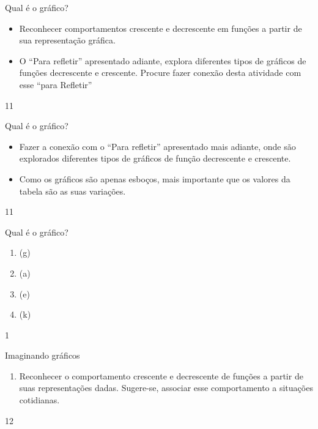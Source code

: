 \clearmargin
\begin{objectives}{Qual é o gráfico?}
{
\begin{itemize}

\item  Reconhecer comportamentos crescente e decrescente em funções a partir de sua representação gráfica.


\item O “Para refletir”{} apresentado adiante, explora diferentes tipos de gráficos de funções decrescente e crescente. Procure fazer conexão desta atividade com esse “para Refletir”

\end{itemize}
}{1}{1}
\end{objectives}
\begin{sugestions}{Qual é o gráfico?}
{
\begin{itemize}
\item Fazer a conexão com o “Para refletir”{} apresentado mais adiante, onde são explorados diferentes tipos de gráficos de função decrescente e crescente.

\item Como os gráficos são apenas esboços, mais importante que os valores da tabela são as suas variações.
\end{itemize}
}{1}{1}
\end{sugestions}
\begin{answer}{Qual é o gráfico?}
{
\begin{enumerate}
\item (g)

\item (a)

\item (e) 

\item (k)

\end{enumerate}
}{1}
\end{answer}
\clearmargin
\begin{objectives}{Imaginando gráficos}
{
\begin{enumerate}

\item Reconhecer o comportamento crescente e decrescente de funções a partir de suas representações dadas. Sugere-se, associar esse comportamento a situações cotidianas.

\end{enumerate}
}{1}{2}
\end{objectives}
